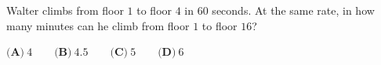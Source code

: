 Walter climbs from floor $1$ to floor $4$ in $60$ seconds. At the same rate, in how many minutes can he climb from floor $1$ to floor $16$?

$\textbf{(A)}\ 4\qquad\textbf{(B)}\ 4.5\qquad\textbf{(C)}\ 5\qquad\textbf{(D)}\ 6$
